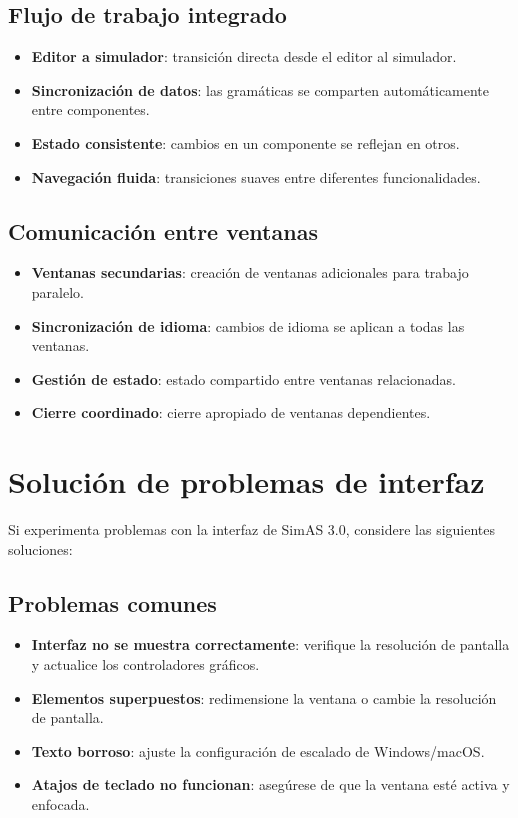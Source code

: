 \subsection{Flujo de trabajo integrado}

\begin{itemize}
    \item \textbf{Editor a simulador}: transición directa desde el editor al simulador.
    \item \textbf{Sincronización de datos}: las gramáticas se comparten automáticamente entre componentes.
    \item \textbf{Estado consistente}: cambios en un componente se reflejan en otros.
    \item \textbf{Navegación fluida}: transiciones suaves entre diferentes funcionalidades.
\end{itemize}

\subsection{Comunicación entre ventanas}

\begin{itemize}
    \item \textbf{Ventanas secundarias}: creación de ventanas adicionales para trabajo paralelo.
    \item \textbf{Sincronización de idioma}: cambios de idioma se aplican a todas las ventanas.
    \item \textbf{Gestión de estado}: estado compartido entre ventanas relacionadas.
    \item \textbf{Cierre coordinado}: cierre apropiado de ventanas dependientes.
\end{itemize}

\section{Solución de problemas de interfaz}

Si experimenta problemas con la interfaz de SimAS 3.0, considere las siguientes soluciones:

\subsection{Problemas comunes}

\begin{itemize}
    \item \textbf{Interfaz no se muestra correctamente}: verifique la resolución de pantalla y actualice los controladores gráficos.
    \item \textbf{Elementos superpuestos}: redimensione la ventana o cambie la resolución de pantalla.
    \item \textbf{Texto borroso}: ajuste la configuración de escalado de Windows/macOS.
    \item \textbf{Atajos de teclado no funcionan}: asegúrese de que la ventana esté activa y enfocada.
\end{itemize}

